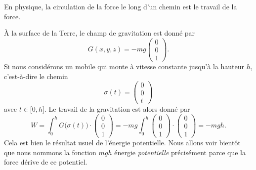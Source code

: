 En physique, la circulation de la force le long d'un chemin est le travail de la force.

\begin{example}
	À la surface de la Terre, le champ de gravitation est donné par
	\begin{equation}
		G(x,y,z)=-mg\begin{pmatrix}
			0 \\
			0 \\
			1
		\end{pmatrix}.
	\end{equation}
	Si nous considérons un mobile qui monte à vitesse constante jusqu'à la hauteur \( h\), c'est-à-dire le chemin
	\begin{equation}
		\sigma(t)=\begin{pmatrix}
			0 \\
			0 \\
			t
		\end{pmatrix}
	\end{equation}
	avec \( t\in\mathopen[ 0 , h \mathclose]\). Le travail de la gravitation est alors donné par
	\begin{equation}
		W=\int_0^hG\big( \sigma(t) \big)\cdot\begin{pmatrix}
			0 \\
			0 \\
			1
		\end{pmatrix}=
		-mg\int_0^h\begin{pmatrix}
			0 \\
			0 \\
			1
		\end{pmatrix}\cdot\begin{pmatrix}
			0 \\
			0 \\
			1
		\end{pmatrix}=-mgh.
	\end{equation}
	Cela est bien le résultat usuel de l'énergie potentielle. Nous allons voir bientôt que nous nommons la fonction \( mgh\) énergie \emph{potentielle} précisément parce que la force dérive de ce potentiel.
\end{example}

